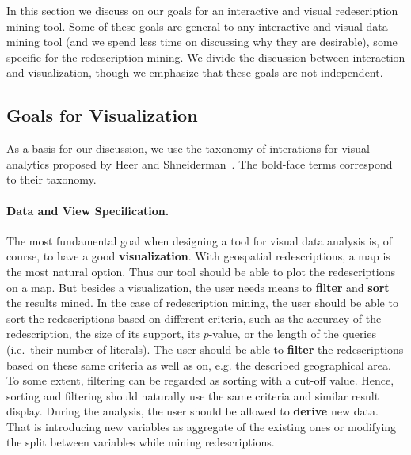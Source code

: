 \documentclass{llncs}
\begin{document}
In this section we discuss on our goals for an interactive and visual
redescription mining tool. Some of these goals are general to any
interactive and visual data mining tool (and we spend less time on
discussing why they are desirable), some specific for the
redescription mining. We divide the discussion between interaction and
visualization, though we emphasize that these goals are not independent.

\subsection{Goals for Visualization}
\label{sec:goals-visualization}
As a basis for our discussion, we use the taxonomy of interations for
visual analytics proposed by Heer and
Shneiderman~\cite{Heer:2012:IDV:2133806.2133821}. The bold-face terms
correspond to their taxonomy.

\paragraph{Data and View Specification.}
The most fundamental goal when designing a tool for visual data
analysis is, of course, to have a good \textbf{visualization}. With
geospatial redescriptions, a map is the most natural option. Thus our
tool should be able to plot the redescriptions on a map. But besides a
visualization, the user needs means to \textbf{filter} and
\textbf{sort} the results mined. In the case of redescription mining,
the user should be able to sort the redescriptions based on different
criteria, such as the accuracy of the redescription, the size of its
support, its $p$-value, or the length of the queries (i.e.\ their
number of literals).  The user should be able to \textbf{filter} the
redescriptions based on these same criteria as well as on, e.g. the
described geographical area.  To some extent, filtering can be
regarded as sorting with a cut-off value. Hence, sorting and filtering
should naturally use the same criteria and similar result display.
During the analysis, the user should be allowed to \textbf{derive} new
data. That is introducing new variables as aggregate of the existing
ones or modifying the split between variables while mining
redescriptions.
\end{document}
